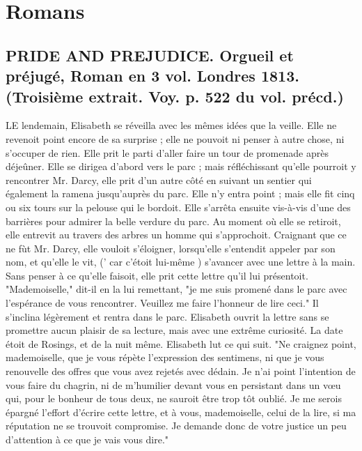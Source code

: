 \setcounter{page}{90}
\chapter{Romans}
\section{PRIDE AND PREJUDICE. Orgueil et préjugé, Roman en 3 vol. Londres 1813. \large{(Troisième extrait. Voy. p. 522 du vol. précd.)}}
LE lendemain, Elisabeth se réveilla avec les mêmes idées que la veille. Elle ne revenoit point encore de sa surprise ; elle ne pouvoit ni penser à autre chose, ni s'occuper de rien. Elle prit le parti d'aller faire un tour de promenade après déjeûner. Elle se dirigea d'abord vers le parc ; mais réfléchissant qu'elle pourroit y rencontrer Mr. Darcy, elle prit d'un autre côté en suivant un sentier qui également la ramena jusqu'auprès du parc. Elle n'y entra point ; mais elle fit cinq ou six tours sur la pelouse qui le bordoit. Elle s'arrêta ensuite vis-à-vis d'une des barrières pour admirer la belle verdure du parc. Au moment où elle se retiroit, elle entrevit au travers des arbres un homme qui s'approchoit. Craignant que ce ne fùt Mr. Darcy, elle vouloit s'éloigner, lorsqu'elle s'entendit appeler par son nom, et qu'elle le vit,\setcounter{page}{91} (' car c'étoit lui-même ) s'avancer avec une lettre à la main. Sans penser à ce qu'elle faisoit, elle prit cette lettre qu'il lui présentoit.
"Mademoiselle," dit-il en la lui remettant, "je me suis promené dans le parc avec l'espérance de vous rencontrer. Veuillez me faire l'honneur de lire ceci." Il s'inclina légèrement et rentra dans le parc.
Elisabeth ouvrit la lettre sans se promettre aucun plaisir de sa lecture, mais avec une extrême curiosité. La date étoit de Rosings, et de la nuit même. Elisabeth lut ce qui suit.
"Ne craignez point, mademoiselle, que je vous répète l'expression des sentimens, ni que je vous renouvelle des offres que vous avez rejetés avec dédain. Je n'ai point l'intention de vous faire du chagrin, ni de m'humilier devant vous en persistant dans un vœu qui, pour le bonheur de tous deux, ne sauroit être trop tôt oublié. Je me serois épargné l'effort d'écrire cette lettre, et à vous, mademoiselle, celui de la lire, si ma réputation ne se trouvoit compromise. Je demande donc de votre justice un peu d'attention à ce que je vais vous dire."
